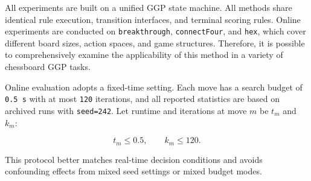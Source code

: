 All experiments are built on a unified GGP state machine. All methods share identical rule execution, transition interfaces, and terminal scoring rules. Online experiments are conducted on \texttt{breakthrough}, \texttt{connectFour}, and \texttt{hex}, which cover different board sizes, action spaces, and game structures. Therefore, it is possible to comprehensively examine the applicability of this method in a variety of chessboard GGP tasks.


Online evaluation adopts a fixed-time setting. Each move has a search budget of \texttt{0.5 s} with at most \texttt{120} iterations, and all reported statistics are based on archived runs with \texttt{seed=242}. Let runtime and iterations at move $m$ be $t_m$ and $k_m$:

\begin{equation}
t_m \le 0.5,\qquad k_m \le 120.
\end{equation}


This protocol better matches real-time decision conditions and avoids confounding effects from mixed seed settings or mixed budget modes.


